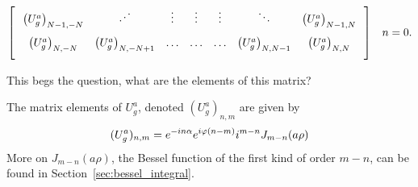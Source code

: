 \documentclass{article}
\begin{document}
\[\begin{matrix}
\begin{bmatrix}
            \hspace{0.25cm} \left(U^{a}_{g}\right)_{N-1,-N}  & \iddots                          & \vdots                         & \vdots                        & \vdots                          & \ddots                          & \left(U^{a}_{g}\right)_{N-1,N}     \hspace{0.25cm} \vspace{0.25cm} \\
            \hspace{0.25cm} \left(U^{a}_{g}\right)_{N,-N}    & \left(U^{a}_{g}\right)_{N,-N+1}  & \ldots                         & \ldots                        & \ldots  & \left(U^{a}_{g}\right)_{N,N-1}  & \left(U^{a}_{g}\right)_{N,N}      \hspace{0.25cm} \vspace{0.25cm} \\
        \end{bmatrix}
            &  n=0.
             \\
    \end{matrix}
\]%
\normalsize

This begs the question, what are the elements of this matrix? 

\begin{theorem}
    The matrix elements of $U^{a}_{g}$, denoted $(U^{a}_{g})_{n,m}$ are given by
    \[%
        (U^{a}_{g})_{n,m} = {e^{-in\alpha} e^{i\varphi(n-m)}i^{m-n}J_{m-n}(a\rho)}  \\ 
    \]%
    More on $J_{m-n}(a\rho)$, the Bessel function of the first kind of order $m-n$, can be found in Section~\ref{sec:bessel_integral}.
\end{theorem}
\end{document}
